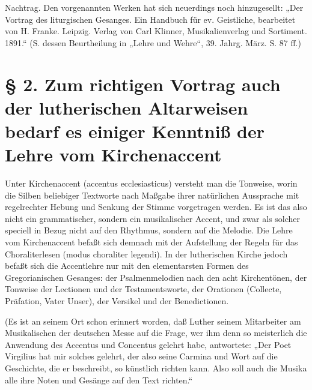 Nachtrag. Den vorgenannten Werken hat sich neuerdings noch hinzugesellt: „Der Vortrag des liturgischen Gesanges. Ein Handbuch für ev. Geistliche, bearbeitet von H. Franke. Leipzig. Verlag von Carl Klinner, Musikalienverlag und Sortiment. 1891.“ (S. dessen Beurtheilung in „Lehre und Wehre“, 39. Jahrg. März. S. 87 ff.)

\section[§ 2. Lehre vom Kirchenaccent]{§ 2. Zum richtigen Vortrag auch der lutherischen Altarweisen bedarf es einiger Kenntniß der Lehre vom Kirchenaccent}


Unter Kirchenaccent (accentus ecclesiasticus) versteht man die Tonweise, worin die Silben beliebiger Textworte nach Maßgabe ihrer natürlichen Aussprache mit regelrechter Hebung und Senkung der Stimme vorgetragen werden. Es ist das also nicht ein grammatischer, sondern ein musikalischer Accent, und zwar als solcher speciell in Bezug nicht auf den Rhythmus, sondern auf die Melodie. Die Lehre vom Kirchenaccent befaßt sich demnach mit der Aufstellung der Regeln für das Choraliterlesen (modus choraliter legendi). In der lutherischen Kirche jedoch befaßt sich die Accentlehre nur mit den elementarsten Formen des Gregorianischen Gesanges: der Psalmenmelodien nach den acht Kirchentönen, der Tonweise der Lectionen und der Testamentsworte, der Orationen (Collecte, Präfation, Vater Unser), der Versikel und der Benedictionen.

(Es ist an seinem Ort schon erinnert worden, daß Luther seinem Mitarbeiter am Musikalischen der deutschen Messe auf die Frage, wer ihm denn so meisterlich die Anwendung des Accentus und Concentus gelehrt habe, antwortete: „Der
Poet Virgilius hat mir solches gelehrt, der also seine Carmina und Wort auf die Geschichte, die er beschreibt, so künstlich richten kann. Also soll auch die Musika alle ihre Noten und Gesänge auf den Text richten.“


